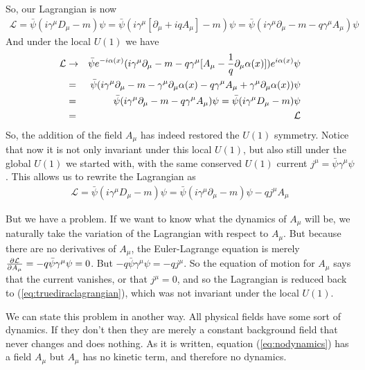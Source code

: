 \documentclass[12pt,epsf]{article}
\def\nolabel{\nonumber }
\def\nolabel{\nonumber }
\begin{document}
So, our Lagrangian is now
\begin{eqnarray}
\mathcal{L} = \bar \psi (i \gamma^{\mu}D_{\mu} - m)\psi = \bar \psi
(i\gamma^{\mu}[\partial_{\mu}+iqA_{\mu}] - m) \psi = \bar \psi
(i\gamma^{\mu}\partial_{\mu} - m - q\gamma^{\mu}A_{\mu})\psi\nolabel
\end{eqnarray}
And under the local $U(1)$ we have
\begin{eqnarray}
\mathcal{L} &\rightarrow & \bar \psi e^{-i\alpha(x)}(i \gamma^{\mu}
\partial_{\mu} - m - q \gamma^{\mu}[A_{\mu} - {1\over
q}\partial_{\mu}\alpha(x)])e^{i\alpha(x)}\psi \nolabel \\
&=& \bar \psi (i \gamma^{\mu}\partial_{\mu} - m -
\gamma^{\mu}\partial_{\mu}\alpha(x) - q\gamma^{\mu}
A_{\mu}+\gamma^{\mu}\partial_{\mu}\alpha(x))\psi \nolabel \\
&=& \bar \psi(i\gamma^{\mu} \partial_{\mu} - m -
q\gamma^{\mu}A_{\mu})\psi = \bar \psi (i \gamma^{\mu}D_{\mu} - m)\psi \nolabel \\
&=& \mathcal{L}\nolabel
\end{eqnarray}
So, the addition of the field $A_{\mu}$ has indeed restored the $U(1)$
symmetry.  Notice that now it is not only invariant under this local
$U(1)$, but also still under the global $U(1)$ we started with, with
the same conserved  $U(1)$ current $j^{\mu} = \bar \psi \gamma^{\mu}
\psi$.	This allows us to rewrite the Lagrangian as 
\begin{eqnarray}
\mathcal{L} = \bar \psi (i\gamma^{\mu}D_{\mu} - m) \psi = \bar \psi
(i\gamma^{\mu}\partial_{\mu} - m)\psi - qj^{\mu}A_{\mu}
\label{eq:nodynamics}
\end{eqnarray}

But we have a problem.	If we want to know what the dynamics of
$A_{\mu}$ will be, we naturally take the variation of the Lagrangian
with respect to $A_{\mu}$.  But because there are no derivatives of
$A_{\mu}$, the Euler-Lagrange equation is merely ${\partial \mathcal{L}
\over \partial A_{\mu}} = -q\bar \psi \gamma^{\mu} \psi = 0$.  But
$-q\bar \psi \gamma^{\mu}\psi = -qj^{\mu}$.  So the equation of motion
for $A_{\mu}$ says that the current vanishes, or that $j^{\mu} = 0$,
and so the Lagrangian is reduced back to
(\ref{eq:truediraclagrangian}), which was not invariant under the local
$U(1)$.  

We can state this problem in another way.  All physical fields have
some sort of dynamics.	If they don't then they are merely a constant
background field that never changes and does nothing.  As it is
written, equation (\ref{eq:nodynamics}) has a field $A_{\mu}$ but
$A_{\mu}$ has no kinetic term, and therefore no dynamics.  
\end{document}
